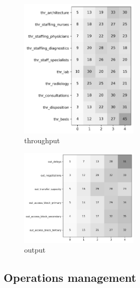 \documentclass{article}
\begin{document}
\begin{figure}[H]
    \centering
        \includegraphics[width=0.5\textwidth]{../output/plots/throughput}
        \caption{throughput}
        \label{fig:throughput}
\end{figure}

\begin{figure}[H]
    \centering
        \includegraphics[width=0.5\textwidth]{../output/plots/output}
        \caption{output}
        \label{fig:output}
\end{figure}

\subsection{Operations management}
\end{document}
